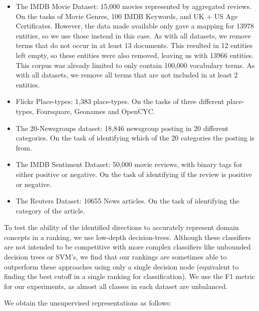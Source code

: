 \begin{itemize} %
	\item The IMDB Movie Dataset: 15,000 movies represented by aggregated reviews. On the tasks of Movie Genres, 100 IMDB Keywords, and UK + US Age Certificates. However, the data made available only gave a mapping for 13978 entities, so we use those instead in this case. As with all datasets, we remove terms that do not occur in at least 13 documents. This resulted in 12 entities left empty, so these entities were also removed, leaving us with 13966 entities. This corpus was already limited to only contain 100,000 vocabulary terms. As with all datasets, we remove all terms that are not included in at least 2 entities.
	\item Flickr Place-types: 1,383 place-types. On the tasks of three different place-types, Foursquare, Geonames and OpenCYC.
	\item The 20-Newsgroups dataset: 18,846 newsgroup posting in 20 different categories. On the task of identifying which of the 20 categories the posting is from.
	\item The IMDB Sentiment Dataset: 50,000 movie reviews, with binary tags for either positive or negative. On the task of identifying if the review is positive or negative.
	\item The Reuters Dataset: 10655 News articles. On the task of identifying the category of the article.
\end{itemize}
To test the ability of the identified directions to accurately represent domain concepts in a ranking, we use low-depth decision-trees. Although these classifiers are not intended to be competitive with more complex classifiers like unbounded decision trees or SVM's, we find that our rankings are sometimes able to outperform these approaches using only a single decision node (equivalent to finding the best cutoff in a single ranking for classification). We use the F1 metric for our experiments, as almost all classes in each dataset are unbalanced. 


We obtain the unsupervised representations as follows:


